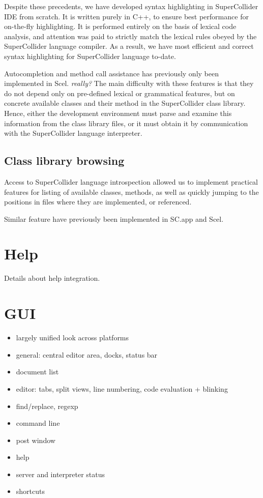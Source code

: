 \documentclass[a4paper,10pt]{article}
\begin{document}
Despite these precedents, we have developed syntax highlighting in SuperCollider IDE from scratch.
It is written purely in C++, to ensure best performance for on-the-fly highlighting. It is performed
entirely on the basis of lexical code analysis, and attention was paid to strictly match the lexical
rules obeyed by the SuperCollider language compiler. As a result, we have most efficient and correct
syntax highlighting for SuperCollider language to-date.

Autocompletion and method call assistance has previously only been implemented in Scel. \emph{really?}
The main difficulty with these features is that they do not depend only on pre-defined lexical or
grammatical features, but on concrete available classes and their method in the SuperCollider class
library. Hence, either the development environment must parse and examine this information from the
class library files, or it must obtain it by communication with the SuperCollider language
interpreter.

\subsection{Class library browsing}

Access to SuperCollider language introspection allowed us to implement practical features for
listing of available classes, methods, as well as quickly jumping to the positions in files
where they are implemented, or referenced.

Similar feature have previously been implemented in SC.app and Scel.

\section{Help}

Details about help integration.

\section{GUI}

\begin{itemize}
 \item largely unified look across platforms
 \item general: central editor area, docks, status bar
 \item document list
 \item editor: tabs, split views, line numbering, code evaluation + blinking
 \item find/replace, regexp
 \item command line
 \item post window
 \item help
 \item server and interpreter status
 \item shortcuts
\end{itemize}
\end{document}
